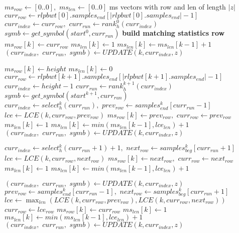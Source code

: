 \documentclass[a4paper,12pt, oneside]{book}
\begin{document}
\begin{algorithm}
  \scriptsize
  \begin{algorithmic}[1]
    \State $ms_{row}\gets [0..0],\,\,ms_{len}\gets [0..0]$
    \Comment ms vectors with row and len of length $|z|$
    \State $curr_{row}\gets
    rlpbwt[0].samples_{end}[|rlpbwt[0].samples_{end}|-1]$
    \State $curr_{index}\gets curr_{row},\,\,curr_{run}\gets
    rank_h^0(curr_{index})$ 
    \State $symb\gets get\_symbol(start^0, curr_{run})$
    \Comment \textbf{build matching statistics row}
    \For {\textit{every} $k\in[0, |z|)$}
    \State $ms_{row}[k]\gets curr_{row}$
    \State $ms_{len}[k] \gets 1$
    \Else
    \State $ms_{len}[k] \gets ms_{len}[k-1]+1$
    \EndIf
     \State $(curr_{index},\,\,curr_{run},\,\,symb)\gets UPDATE(k, curr_{index},
    z)$ 
    \EndIf
    \Else
    
    \State $ms_{row}[k]\gets height$
    \State $ms_{len}[k]\gets 0$
    \State $curr_{row}\gets
    rlpbwt[k+1].samples_{end}[|rlpbwt[k+1].samples_{end}|-1]$
    \State $curr_{index}\gets height-1$
    \State $curr_{run}\gets rank_h^{k+1}(curr_{index})$
    \State $symb\gets get\_symbol(start^{k+1}, curr_{run})$
    \EndIf
    \Else
    \State $curr_{index}\gets select_h^k(curr_{run}),\,\,prev_{row}\gets
    samples_{end}^k[curr_{run}-1]$ 
    \State $lce\gets LCE(k, curr_{row}, prev_{row})$
    \State $ms_{row}[k]\gets prev_{row},\,\,curr_{row}\gets prev_{row}$
    \State $ms_{len}[k] \gets 1$
    \Else
    \State $ms_{len}[k] \gets min(ms_{len}[k-1], lce_{len})+1$
    \EndIf
    \State $(curr_{index},\,\,curr_{run},\,\,symb)\gets UPDATE(k, curr_{index},
    z)$  
    \EndIf
    
    \State $curr_{index}\gets select_h^k(curr_{run}+1)+1,\,\,next_{row}\gets
    samples_{beg}^k[curr_{run}+1]$ 
    \State $lce\gets LCE(k, curr_{row}, next_{row})$
    \State $ms_{row}[k]\gets next_{row},\,\,curr_{row}\gets next_{row}$
    \State $ms_{len}[k] \gets 1$
    \Else
    \State $ms_{len}[k] \gets min(ms_{len}[k-1], lce_{len})+1$
    \EndIf
  
    \State $(curr_{index},\,\,curr_{run},\,\,symb)\gets UPDATE(k, curr_{index},
    z)$ 
    \EndIf
    \Else
    \State $prev_{row}\gets samples_{end}^k[curr_{run}-1],\,\,next_{row}\gets
    samples_{beg}^k[curr_{run}+1]$ 
    \State $lce\gets \max_{len} (LCE(k, curr_{row}, prev_{row}), LCE(k,
    curr_{row}, next_{row}))$
    \State $curr_{row}\gets lce_{row}$
    \State $ms_{row}[k]\gets curr_{row}$
    \State $ms_{len}[k] \gets 1$
    \Else
    \State $ms_{len}[k] \gets min(ms_{len}[k-1], lce_{len})+1$
    \EndIf
    \State $(curr_{index},\,\,curr_{run},\,\,symb)\gets UPDATE(k, curr_{index},
    z)$ 
    \EndIf
    \EndIf
    \EndIf
    \EndIf
    \EndFor
    

\end{algorithmic}
\end{algorithm}
\end{document}
